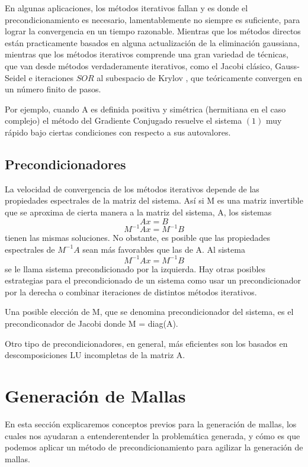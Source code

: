 \documentclass[11pt,letterpaper]{article}
\begin{document}
En algunas aplicaciones, los métodos iterativos fallan y es donde el precondicionamiento es necesario, lamentablemente no siempre es suficiente, para lograr la convergencia en un tiempo razonable.
Mientras que los métodos directos están practicamente basados en alguna actualización de la eliminación gaussiana, mientras que los métodos iterativos comprende una gran variedad de técnicas, que van desde métodos verdaderamente iterativos, como el Jacobi clásico, Gauss-Seidel e iteraciones $SOR$ al subespacio de Krylov , que teóricamente convergen en un número finito de pasos.

Por ejemplo, cuando A es definida positiva y simétrica (hermitiana en el caso complejo) el método del Gradiente Conjugado resuelve el sistema $(1)$ muy rápido bajo ciertas condiciones con respecto a sus autovalores.


\subsection{Precondicionadores}

La velocidad de convergencia de los métodos iterativos depende de las propiedades espectrales de la matriz del sistema. Así si M es una matriz invertible que se aproxima de cierta manera a la matriz del sistema, A, los
sistemas
\[Ax = B\]
\[M^{-1}Ax = M^{-1}B\]
tienen las mismas soluciones. No obstante, es posible que las propiedades espectrales de $M^{-1}A$ sean más favorables que las de A. Al sistema
\[M^{-1}Ax = M^{-1}B\]
se le llama sistema precondicionado por la izquierda. Hay otras posibles estrategias para el precondicionado de un sistema como usar un precondicionador por la derecha o combinar iteraciones de distintos métodos iterativos.

Una posible elección de M, que se denomina precondicionador del sistema, es el precondiconador de Jacobi donde M = diag(A).

Otro tipo de precondicionadores, en general, más eficientes son los basados
en descomposiciones LU incompletas de la matriz A.


\section{Generación de Mallas}
En esta sección explicaremos conceptos previos para la generación de mallas, los cuales nos ayudaran a entenderentender la problemática generada, y cómo es que podemos aplicar un m\'etodo de precondicionamiento para agilizar la generaci\'on de mallas.
\end{document}
